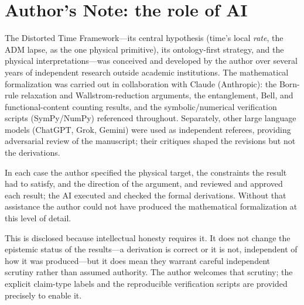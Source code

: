 \documentclass[11pt]{article}
\begin{document}
\section*{Author's Note: the role of AI}
{\small
The Distorted Time Framework---its central hypothesis (time's local \emph{rate}, the ADM lapse,
as the one physical primitive), its ontology-first strategy, and the physical
interpretations---was conceived and developed by the author over several years of independent
research outside academic institutions. The mathematical formalization was carried out in
collaboration with Claude (Anthropic): the Born-rule relaxation and Wallstrom-reduction arguments,
the entanglement, Bell, and functional-content counting results, and the symbolic/numerical
verification scripts (SymPy/NumPy) referenced throughout. Separately, other large language models
(ChatGPT, Grok, Gemini) were used as independent referees, providing adversarial review of the
manuscript; their critiques shaped the revisions but not the derivations.

In each case the author specified the physical target, the constraints the result had to satisfy,
and the direction of the argument, and reviewed and approved each result; the AI executed and
checked the formal derivations. Without that assistance the author could not have produced the
mathematical formalization at this level of detail.

This is disclosed because intellectual honesty requires it. It does not change the epistemic status
of the results---a derivation is correct or it is not, independent of how it was produced---but it
does mean they warrant careful independent scrutiny rather than assumed authority. The author
welcomes that scrutiny; the explicit claim-type labels and the reproducible verification scripts are
provided precisely to enable it.
\par}
\end{document}
